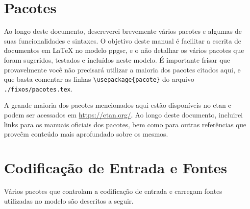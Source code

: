 \section{Pacotes}

Ao longo deste documento, descreverei brevemente vários pacotes e algumas de suas funcionalidades e sintaxes. O objetivo deste manual é facilitar a escrita de documentos em \LaTeX{} no modelo \gls{ppgsc}, e o não detalhar os vários pacotes que foram sugeridos, testados e incluídos neste modelo. É importante frisar que provavelmente você não precisará utilizar a maioria dos pacotes citados aqui, e que basta comentar as linhas \texttt{\textbackslash usepackage\{pacote\}} do arquivo \texttt{./fixos/pacotes.tex}.

A grande maioria dos pacotes mencionados aqui estão disponíveis no \gls{ctan} e podem ser acessados em \url{https://ctan.org/}. Ao longo deste documento, incluirei links para os manuais oficiais dos pacotes, bem como para outras referências que proveêm conteúdo mais aprofundado sobre os mesmos.

\section{Codificação de Entrada e Fontes}

Vários pacotes que controlam a codificação de entrada e carregam fontes utilizadas no modelo são descritos a seguir.


